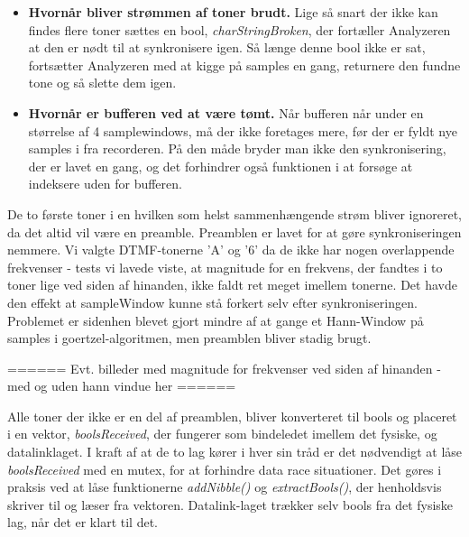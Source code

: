 \begin{itemize}

\item \textbf{Hvornår bliver strømmen af toner brudt.} Lige så snart der ikke kan findes flere toner sættes en bool, \textit{charStringBroken}, der fortæller Analyzeren at den er nødt til at synkronisere igen. Så længe denne bool ikke er sat, fortsætter Analyzeren med at kigge på samples en gang, returnere den fundne tone og så slette dem igen. 
\item \textbf{Hvornår er bufferen ved at være tømt.} Når bufferen når under en størrelse af 4 samplewindows, må der ikke foretages mere, før der er fyldt nye samples i fra recorderen. På den måde bryder man ikke den synkronisering, der er lavet en gang, og det forhindrer også funktionen i at forsøge at indeksere uden for bufferen.
\end{itemize}

De to første toner i en hvilken som helst sammenhængende strøm bliver ignoreret, da det altid vil være en preamble. Preamblen er lavet for at gøre synkroniseringen nemmere. Vi valgte DTMF-tonerne 'A' og '6' da de ikke har nogen overlappende frekvenser - tests vi lavede viste, at magnitude for en frekvens, der fandtes i to toner lige ved siden af hinanden, ikke faldt ret meget imellem tonerne. Det havde den effekt at sampleWindow kunne stå forkert selv efter synkroniseringen. Problemet er sidenhen blevet gjort mindre af at gange et Hann-Window på samples i goertzel-algoritmen, men preamblen bliver stadig brugt. 

====== Evt. billeder med magnitude for frekvenser ved siden af hinanden - med og uden hann vindue her ======

Alle toner der ikke er en del af preamblen, bliver konverteret til bools og placeret i en vektor, \textit{boolsReceived}, der fungerer som bindeledet imellem det fysiske, og datalinklaget. I kraft af at de to lag kører i hver sin tråd er det nødvendigt at låse \textit{boolsReceived} med en mutex, for at forhindre data race situationer. Det gøres i praksis ved at låse funktionerne \textit{addNibble()} og \textit{extractBools()}, der henholdsvis skriver til og læser fra vektoren. Datalink-laget trækker selv bools fra det fysiske lag, når det er klart til det.